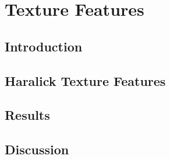 \chapter{Texture Features}\label{ch:texture}
\section{Introduction}
\cite{Martinez-Murcia2013266,Martinez-Murcia2014}
\section{Haralick Texture Features}

\section{Results}

\section{Discussion}